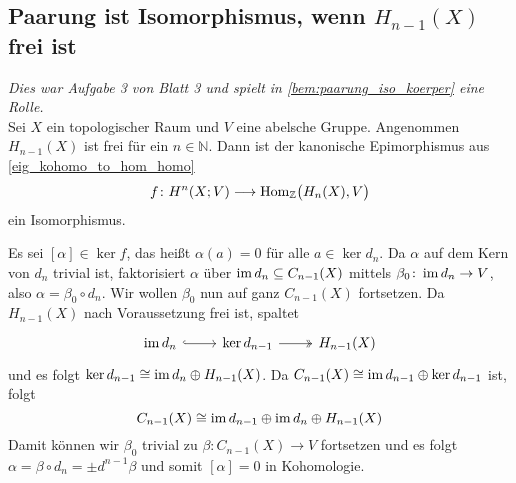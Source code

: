 \subsection{Paarung ist Isomorphismus, wenn $H_{n-1}(X)$ frei ist} %
\label{sub:paarung_isomorphismus_frei}
\emph{Dies war Aufgabe 3 von Blatt 3 und spielt in \autoref{bem:paarung_iso_koerper} eine Rolle.}\smallskip\\
Sei $X$ ein topologischer Raum und $V$ eine abelsche Gruppe.
Angenommen $H_{n-1}(X)$ ist frei für ein $n \in \mathbb{N}$.
Dann ist der kanonische Epimorphismus aus \autoref{eig_kohomo_to_hom_homo}
\[
	f \colon H^n(X;V) \longrightarrow \Hom_\mathbb{Z} \enbrace[\big]{H_n(X),V}
\]
ein Isomorphismus.
\begin{beweis}
	Es sei $[\alpha] \in \ker f$, das heißt $\alpha(a)=0$ für alle $a \in \ker d_n$.
	Da $\alpha$ auf dem Kern von $d_n$ trivial ist, faktorisiert $\alpha$ über $\im d_n \subseteq C_{n-1}(X)$ mittels $\beta_0 \colon \im d_n \to V$, also $\alpha = \beta_0 \circ d_n$.
	Wir wollen $\beta_0$ nun auf ganz $C_{n-1}(X)$ fortsetzen.
	Da $H_{n-1}(X)$ nach Voraussetzung frei ist, spaltet 
	\[
		\begin{tikzcd}
			\im d_n \rar[hook] & \ker d_{n-1} \rar[two heads] & H_{n-1}(X)
		\end{tikzcd}
	\]
	und es folgt $\ker d_{n-1} \cong \im d_n \oplus H_{n-1}(X)$.
	Da $C_{n-1}(X) \cong \im d_{n-1} \oplus \ker d_{n-1}$ ist, folgt
	\[
		C_{n-1}(X) \cong \im d_{n-1} \oplus \im d_n \oplus H_{n-1}(X)
	\]
	Damit können wir $\beta_0$ trivial zu $\beta \colon C_{n-1}(X) \to V$ fortsetzen und es folgt $\alpha= \beta \circ d_n = \pm d^{n-1} \beta$ und somit $[\alpha]=0$ in Kohomologie.
\end{beweis}

